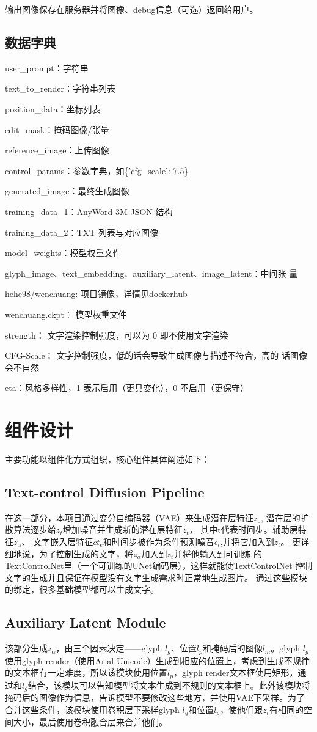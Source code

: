 \documentclass[a4paper,12pt]{article}
\begin{document}
输出图像保存在服务器并将图像、debug信息（可选）返回给用户。
\subsection{数据字典}
user\_prompt：字符串

text\_to\_render：字符串列表

position\_data：坐标列表

edit\_mask：掩码图像/张量

reference\_image：上传图像

control\_params：参数字典，如\{'cfg\_scale': 7.5\}

generated\_image：最终生成图像

training\_data\_1：AnyWord-3M JSON 结构

training\_data\_2：TXT 列表与对应图像

model\_weights：模型权重文件

glyph\_image、text\_embedding、auxiliary\_latent、image\_latent：中间张
量

hehe98/wenchuang: 项目镜像，详情见dockerhub

wenchuang.ckpt： 模型权重文件

strength： 文字渲染控制强度，可以为 0 即不使用文字渲染

CFG-Scale： 文字控制强度，低的话会导致生成图像与描述不符合，高的
话图像会不自然

eta：风格多样性，1 表示启用（更具变化），0 不启用（更保守）

\section{组件设计}
主要功能以组件化方式组织，核心组件具体阐述如下：
\subsection{Text-control Diffusion Pipeline}
在这一部分，本项目通过变分自编码器（VAE）来生成潜在层特征$z_0$,
潜在层的扩散算法逐步给$z_t$增加噪音并生成新的潜在层特征$z_t$，
其中t代表时间步。辅助层特征$z_\alpha$、
文字嵌入层特征$ct_e$和时间步被作为条件预测噪音$\epsilon_t$,并将它加入到$z_t$。
更详细地说，为了控制生成的文字，将$z_\alpha$加入到$z_t$并将他输入到可训练
的TextControlNet里（一个可训练的UNet编码层），这样就能使TextControlNet
控制文字的生成并且保证在模型没有文字生成需求时正常地生成图片。
通过这些模块的绑定，很多基础模型都可以生成文字。
\subsection{Auxiliary Latent Module}
该部分生成$z_\alpha$，由三个因素决定——glyph $l_g$、位置$l_p$和掩码后的图像$l_m$。glyph $l_g$使用glyph render（使用Arial Unicode）生成到相应的位置上，考虑到生成不规律的文本框有一定难度，所以该模块使用位置$l_p$，glyph render文本框使用矩形，通过和$l_g$结合，该模块可以告知模型将文本生成到不规则的文本框上。此外该模块将掩码后的图像作为信息，告诉模型不要修改这些地方，并使用VAE下采样。为了合并这些条件，该模块使用卷积层下采样glyph $l_g$和位置$l_p$，使他们跟$z_t$有相同的空间大小，最后使用卷积融合层来合并他们。
\end{document}
